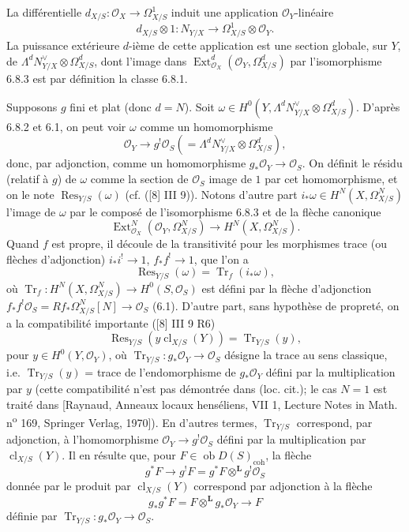 \documentclass[11pt]{article}
\DeclareMathOperator{\Ext}{Ext}
\newcommand{\ob}{\operatorname{ob}}
\providecommand{\cl}{\operatorname{cl}}
\providecommand{\OO}{\mathcal{O}}
\providecommand{\LL}{\mathbf L}
\providecommand{\coh}{\mathrm{coh}}
\providecommand{\ob}{\operatorname{ob}}
\providecommand{\cl}{\operatorname{cl}}
\providecommand{\coh}{\mathrm{coh}}
\providecommand{\cl}{\operatorname{cl}}
\begin{document}
La différentielle $d_{X/S}:\OO_X\to\Omega^1_{X/S}$ induit une application $\OO_Y$-linéaire
\[
d_{X/S}\otimes 1:N_{Y/X}\longrightarrow \Omega^1_{X/S}\otimes\OO_Y.
\]
La puissance extérieure $d$-ième de cette application est une section globale, sur $Y$, de $\Lambda^d N_{Y/X}^{\vee}\otimes\Omega^d_{X/S}$, dont l'image dans $\Ext^d_{\OO_X}(\OO_Y,\Omega^d_{X/S})$ par l'isomorphisme 6.8.3 est par définition la classe 6.8.1.

Supposons $g$ fini et plat (donc $d=N$). Soit $\omega\in H^0(Y,\Lambda^d N_{Y/X}^{\vee}\otimes\Omega^d_{X/S})$. D'après 6.8.2 et 6.1, on peut voir $\omega$ comme un homomorphisme
\[
\OO_Y\longrightarrow g^!\OO_S(=\Lambda^d N_{Y/X}^{\vee}\otimes\Omega^d_{X/S}),
\]
donc, par adjonction, comme un homomorphisme $g_*\OO_Y\to\OO_S$. On définit le résidu (relatif à $g$) de $\omega$ comme la section de $\OO_S$ image de $1$ par cet homomorphisme, et on le note $\operatorname{Res}_{Y/S}(\omega)$ (cf. ([8] III 9)). Notons d'autre part $i_*\omega\in H^N(X,\Omega^N_{X/S})$ l'image de $\omega$ par le composé de l'isomorphisme 6.8.3 et de la flèche canonique
\[
\Ext^N_{\OO_X}(\OO_Y,\Omega^N_{X/S})\longrightarrow H^N(X,\Omega^N_{X/S}).
\]
Quand $f$ est propre, il découle de la transitivité pour les morphismes trace (ou flèches d'adjonction) $i_*i^!\to 1$, $f_*f^!\to 1$, que l'on a
\begin{equation}
\tag{6.8.4}
\operatorname{Res}_{Y/S}(\omega)=\operatorname{Tr}_f(i_*\omega),
\end{equation}
où $\operatorname{Tr}_f:H^N(X,\Omega^N_{X/S})\to H^0(S,\OO_S)$ est défini par la flèche d'adjonction $f_*f^!\OO_S=Rf_*\Omega^N_{X/S}[N]\to\OO_S$ (6.1). D'autre part, sans hypothèse de propreté, on a la compatibilité importante ([8] III 9 R6)
\begin{equation}
\tag{6.8.5}
\operatorname{Res}_{Y/S}(y\cl_{X/S}(Y))=\operatorname{Tr}_{Y/S}(y),
\end{equation}
pour $y\in H^0(Y,\OO_Y)$, où $\operatorname{Tr}_{Y/S}:g_*\OO_Y\to\OO_S$ désigne la trace au sens classique, i.e. $\operatorname{Tr}_{Y/S}(y)$ = trace de l'endomorphisme de $g_*\OO_Y$ défini par la multiplication par $y$ (cette compatibilité n'est pas démontrée dans (loc. cit.); le cas $N=1$ est traité dans [Raynaud, Anneaux locaux henséliens, VII 1, Lecture Notes in Math. n\textsuperscript{o} 169, Springer Verlag, 1970]). En d'autres termes, $\operatorname{Tr}_{Y/S}$ correspond, par adjonction, à l'homomorphisme $\OO_Y\to g^!\OO_S$ défini par la multiplication par $\cl_{X/S}(Y)$. Il en résulte que, pour $F\in\ob D(S)_{\coh}$, la flèche
\begin{equation}
\tag{6.8.6}
g^*F\longrightarrow g^!F=g^*F\otimes^{\LL}g^!\OO_S
\end{equation}
donnée par le produit par $\cl_{X/S}(Y)$ correspond par adjonction à la flèche
\begin{equation}
\tag{6.8.7}
g_*g^*F=F\otimes^{\LL}g_*\OO_Y\longrightarrow F
\end{equation}
définie par $\operatorname{Tr}_{Y/S}:g_*\OO_Y\to\OO_S$.
\end{document}
